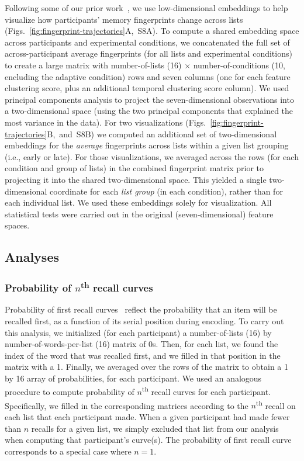 \documentclass[11pt]{article}
\newcommand{\fingerprintTrajectoryRandom}{S8}
\begin{document}
Following some of our prior work~\citep{HeusEtal18a, HeusEtal21}, we use
low-dimensional embeddings to help visualize how participants' memory
fingerprints change across lists
(Figs.~\ref{fig:fingerprint-trajectories}A,~\fingerprintTrajectoryRandom A). To
compute a shared embedding space across participants and experimental
conditions, we concatenated the full set of across-participant average
fingerprints (for all lists and experimental conditions) to create a large
matrix with number-of-lists (16) $\times$ number-of-conditions (10, encluding
the adaptive condition) rows and seven columns (one for each feature clustering
score, plus an additional temporal clustering score column). We used principal
components analysis to project the seven-dimensional observations into a
two-dimensional space (using the two principal components that explained the
most variance in the data). For two visualizations
(Figs.~\ref{fig:fingerprint-trajectories}B,~and~\fingerprintTrajectoryRandom B)
we computed an additional set of two-dimensional embeddings for the
\textit{average} fingerprints across lists within a given list grouping (i.e.,
early or late). For those visualizations, we averaged across the rows (for each
condition and group of lists) in the combined fingerprint matrix prior to
projecting it into the shared two-dimensional space. This yielded a single
two-dimensional coordinate for each \textit{list group} (in each condition),
rather than for each individual list. We used these embeddings solely for
visualization. All statistical tests were carried out in the original
(seven-dimensional) feature spaces.

\subsection*{Analyses}

\subsubsection*{Probability of $n$\textsuperscript{th} recall curves}

Probability of first recall curves~\citep{AtkiShif68, PostPhil65, WelcBurn24}
reflect the probability that an item will be recalled first, as a function of
its serial position during encoding. To carry out this analysis, we initialized
(for each participant) a number-of-lists (16) by number-of-words-per-list (16)
matrix of 0s. Then, for each list, we found the index of the word that was
recalled first, and we filled in that position in the matrix with a 1. Finally,
we averaged over the rows of the matrix to obtain a 1 by 16 array of
probabilities, for each participant. We used an analogous procedure to compute
probability of $n$\textsuperscript{th} recall curves for each participant.
Specifically, we filled in the corresponding matrices according to the
$n$\textsuperscript{th} recall on each list that each participant made. When a
given participant had made fewer than $n$ recalls for a given list, we simply
excluded that list from our analysis when computing that participant's
curve(s). The probability of first recall curve corresponds to a special case
where $n = 1$.
\end{document}
